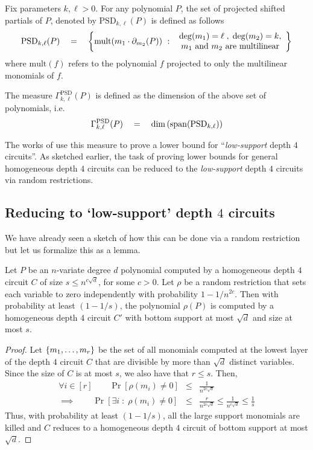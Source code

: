 \documentclass[12pt]{report}
\begin{document}
\begin{definition}
Fix parameters $k,\ell > 0$. For any polynomial $P$, the set of projected shifted partials of $P$, denoted by $\mathrm{PSD}_{k,\ell}(P)$ is defined as follows
\[
\mathrm{PSD}_{k,\ell}(P) \quad = \quad \left\{{\mathrm{mult}(m_1 \cdot \partial_{m_2}(P))}\ : \ {\begin{array}{c}\deg(m_1) = \ell\;,\; \deg(m_2) = k,\\ \text{$m_1$ and $m_2$ are multilinear}\end{array}}\right\}
\]
where $\mathrm{mult}(f)$ refers to the polynomial $f$ projected to only the multilinear monomials of $f$. 

The measure $\Gamma^{\mathrm{PSD}}_{k,\ell}(P)$ is defined as the dimension of the above set of polynomials, i.e.
\[\Gamma^{\mathrm{PSD}}_{k,\ell}(P) \quad = \quad \dim\left(\mathrm{span}(\mathrm{PSD}_{k,\ell})\right)\]
\end{definition}

The works of \cite{KLSS,KS14} use this measure to prove a lower bound for ``\emph{low-support} depth $4$ circuits''. As sketched earlier, the task of proving lower bounds for general homogeneous depth $4$ circuits can be reduced to the \emph{low-support} depth $4$ circuits via random restrictions. 

\subsection{Reducing to `low-support' depth $4$ circuits}\label{sec:red-to-low-support}

We have already seen a sketch of how this can be done via a random restriction but let us formalize this as a lemma. 

\begin{lemma}\label{lem:red-to-low-supp}
Let $P$ be an $n$-variate degree $d$ polynomial computed by a homogeneous depth $4$ circuit $C$ of size $s \leq n^{c\sqrt{d}}$, for some $c>0$. Let $\rho$ be a random restriction that sets each variable to zero independently with probability $1 - 1/n^{2c}$. Then with probability at least $(1 - 1/s)$, the polynomial $\rho(P)$ is computed by a homogeneous depth $4$ circuit $C'$ with bottom support at most $\sqrt{d}$ and size at most $s$. 
\end{lemma}
\begin{proof}
Let $\left\{m_1,\dots, m_r\right\}$ be the set of all monomials computed at the lowest layer of the depth $4$ circuit $C$ that are divisible by more than $\sqrt{d}$ distinct variables. Since the size of $C$ is at most $s$, we also have that $r\leq s$. Then,
\begin{eqnarray*}
\forall i\in [r] \qquad \Pr[\rho(m_i) \neq 0] & \leq & \frac{1}{n^{2c\sqrt{d}}}\\
\implies \qquad \Pr[\exists i \;:\; \rho(m_i) \neq 0] & \leq & \frac{r}{n^{2c\sqrt{d}}} \leq \frac{1}{n^{c\sqrt{d}}} \leq \frac{1}{s}
\end{eqnarray*}
Thus, with probability at least $(1 - 1/s)$, all the large support monomials are killed and $C$ reduces to a homogeneous depth $4$ circuit of bottom support at most $\sqrt{d}$. 
\end{proof}
\end{document}
